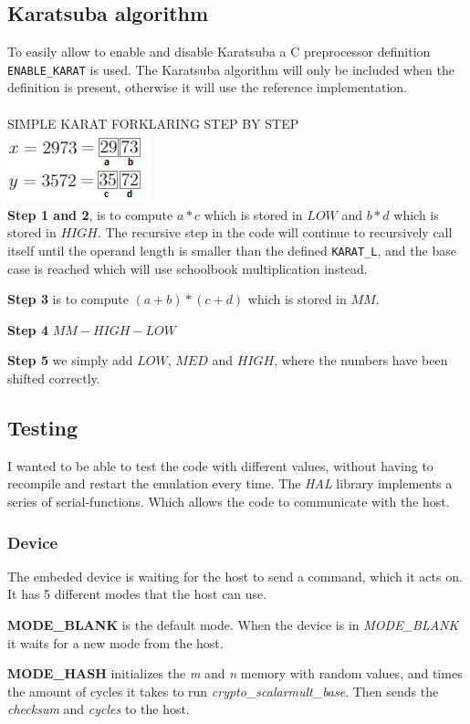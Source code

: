 \subsection{Karatsuba algorithm}
To easily allow to enable and disable Karatsuba a C preprocessor definition \texttt{ENABLE\_KARAT} is used. The Karatsuba algorithm will only be included when the definition is present, otherwise it will use the reference implementation.\\
\\
SIMPLE KARAT FORKLARING STEP BY STEP\\
\includegraphics{report/images/karat-split.png}\\
\textbf{Step 1 and 2}, is to compute $a * c$ which is stored in $LOW$ and $b * d$ which is stored in $HIGH$. The recursive step in the code will continue to recursively call itself until the operand length is smaller than the defined \texttt{KARAT\_L}, and the base case is reached which will use schoolbook multiplication instead.

\textbf{Step 3} is to compute $(a + b) * (c + d)$ which is stored in $MM$.

\textbf{Step 4}  $MM - HIGH - LOW$

\textbf{Step 5} we simply add $LOW$, $MED$ and $HIGH$, where the numbers have been shifted correctly.


\subsection{Testing}
\label{sub-testing}
I wanted to be able to test the code with different values, without having to recompile and restart the emulation every time. The \textit{HAL} library implements a series of serial-functions. Which allows the code to communicate with the host.
\subsubsection{Device}
The embeded device is waiting for the host to send a command, which it acts on. It has 5 different modes that the host can use.

\textbf{MODE\_BLANK} is the default mode. When the device is in \textit{MODE\_BLANK} it waits for a new mode from the host.

\textbf{MODE\_HASH} initializes the \textit{m} and \textit{n} memory with random values, and times the amount of cycles it takes to run \textit{crypto\_scalarmult\_base}. Then sends the \textit{checksum} and \textit{cycles} to the host.\\ 


